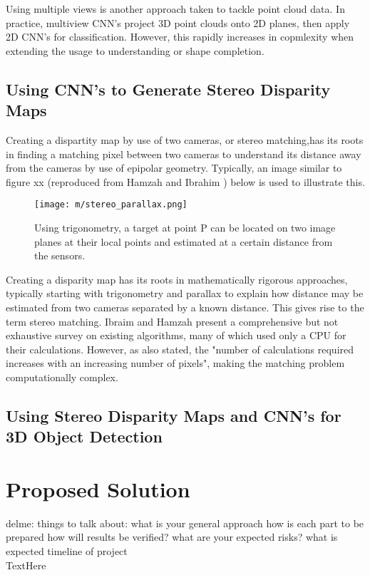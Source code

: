 Using multiple views is another approach taken to tackle point cloud data. In practice, multiview CNN's project 3D point clouds onto 2D planes, then apply 2D CNN's for classification. However, this rapidly increases in copmlexity when extending the usage to understanding or shape completion. 

\subsection{Using CNN's to Generate Stereo Disparity Maps}
Creating a dispartity map by use of two cameras, or stereo matching,has its roots in finding a matching pixel between two cameras to understand its distance away from the cameras by use of epipolar geometry. Typically, an image similar to figure xx (reproduced from Hamzah and Ibrahim \cite{hamzah_literature_2016}) below is used to illustrate this. 

\begin{figure}[h] %
    \centering
    \texttt{[image: m/stereo\_parallax.png]}
    \caption{Using trigonometry, a target at point P can be located on two image planes at their local points and estimated at a certain distance from the sensors.}
\end{figure}

Creating a disparity map has its roots in mathematically rigorous approaches, typically starting with trigonometry and parallax to explain how distance may be estimated from two cameras separated by a known distance. This gives rise to the term stereo matching. Ibraim and Hamzah \cite{hamzah_literature_2016} present a comprehensive but not exhaustive survey on existing algorithms, many of which used only a CPU for their calculations. However, as also stated, the "number of calculations required increases with an increasing number of pixels", making the matching problem computationally complex. 

\subsection{Using Stereo Disparity Maps and CNN's for 3D Object Detection}


\section{Proposed Solution}
delme: things to talk about: 
	what is your general approach
	how is each part to be prepared
	how will results be verified?
	what are your expected risks?
	what is expected timeline of project \\
TextHere








